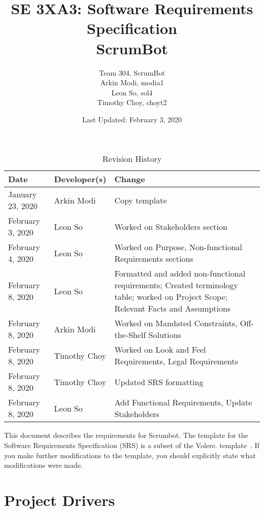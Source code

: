 \documentclass[12pt, titlepage]{article}
\title{SE 3XA3: Software Requirements Specification\\ScrumBot}
\author{
    Team 304, ScrumBot
        \\ Arkin Modi, modia1
        \\ Leon So, sol4
        \\ Timothy Choy, choyt2
}
\date{Last Updated: February 3, 2020}
\begin{document}
\maketitle

\tableofcontents
\listoftables
\listoffigures

\begin{table}[!hbp]
    \caption{Revision History} \label{TblRevisionHistory}
    \begin{tabularx}{\textwidth}{llX}
        \toprule
            \textbf{Date} & \textbf{Developer(s)} & \textbf{Change}\\
        \midrule
            January 23, 2020 & Arkin Modi & Copy template\\
            February 3, 2020 & Leon So & Worked on Stakeholders section\\
            February 4, 2020 & Leon So & Worked on Purpose, Non-functional Requirements sections\\
            February 8, 2020 & Leon So & Formatted and added non-functional requirements; Created terminology table; worked on Project Scope; Relevant Facts and Assumptions\\
            February 8, 2020 & Arkin Modi & Worked on Mandated Constraints, Off-the-Shelf Solutions\\
            February 8, 2020 & Timothy Choy & Worked on Look and Feel Requirements, Legal Requirements\\
            February 8, 2020 & Timothy Choy & Updated SRS formatting\\
            February 8, 2020 & Leon So & Add Functional Requirements, Update Stakeholders\\
        \bottomrule
    \end{tabularx}
\end{table}

\newpage


This document describes the requirements for Scrumbot.  The template for the Software
Requirements Specification (SRS) is a subset of the Volere.
template~\citep{RobertsonAndRobertson2012}.  If you make further modifications
to the template, you should explicitly state what modifications were made.

\section{Project Drivers}
\end{document}
